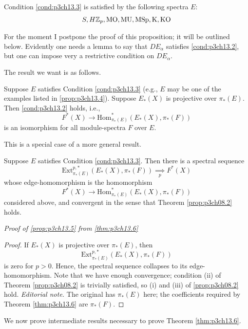 \documentclass[../main]{subfiles}
\begin{document}
\begin{proposition}\label{prop:p3ch13.4}
Condition \ref{cond:p3ch13.3} is satisfied by the following spectra $E$:
\[S, H\mathbb{Z}_p, \mathrm{MO, MU, MSp, K, KO}\]
\end{proposition}
For the moment I postpone the proof of this proposition; it will be outlined below. Evidently one needs a lemma to say that $DE_\alpha$ satisfies \ref{cond:p3ch13.2}, but one can impose very a restrictive condition on $DE_\alpha$.

The result we want is as follows.
\begin{proposition}\label{prop:p3ch13.5} Suppose $E$ satisfies Condition \ref{cond:p3ch13.3} (e.g., $E$ may be one of the examples listed in \ref{prop:p3ch13.4}). Suppose $E_\ast(X)$ is projective over $\pi_\ast(E)$. Then \ref{cond:p3ch13.2} holds, i.e.,
\[F^\ast(X) \longrightarrow \text{Hom}^\ast_{\pi_\ast(E)}(E_\ast(X), \pi_\ast(F))\]
is an isomorphism for all module-spectra $F$ over $E$.
\end{proposition}
This is a special case of a more general result.
\begin{theorem}\label{thm:p3ch13.6}
Suppose $E$ satisfies Condition \ref{cond:p3ch13.3}. Then there is a spectral sequence
\[
\text{Ext}^{p, \ast}_{\pi_\ast(E)}(E_\ast(X), \pi_\ast(F)) \underset{p}{\implies}F^{\ast}(X)
\]
whose edge-homomorphism is the homomorphism
\[F^\ast(X) \longrightarrow \text{Hom}^\ast_{\pi_\ast(E)}(E_\ast(X), \pi_\ast(F))\]
considered above, and convergent in the sense that Theorem \ref{prop:p3ch08.2} holds.
\end{theorem}
\emph{Proof of \ref{prop:p3ch13.5} from \ref{thm:p3ch13.6}} \begin{proof} If $E_\ast(X)$ is projective over $\pi_\ast(E)$, then 
\[
\text{Ext}^{p, \ast}_{\pi_\ast(E)}(E_\ast(X),\pi_\ast(F))
\]
is zero for $p > 0$. Hence, the spectral sequence collapses to its edge-homomorphism. Note that we have enough convergence; condition (ii) of Theorem \ref{prop:p3ch08.2} is trivially satisfied, so (i) and (iii) of \ref{prop:p3ch08.2} hold.
\noindent\textit{Editorial note.} The original has $\pi_\ast(E)$ here; the coefficients required by Theorem \ref{thm:p3ch13.6} are $\pi_\ast(F)$.
\end{proof}
We now prove intermediate results necessary to prove Theorem \ref{thm:p3ch13.6}.
\end{document}
